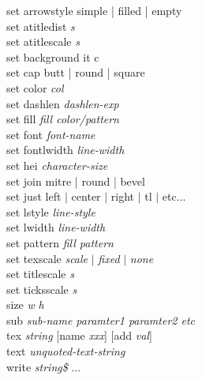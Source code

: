 {\sf set arrowstyle {\sf simple | filled | empty}} \\
{\sf set atitledist {\it s}}  \\
{\sf set atitlescale {\it s}}  \\
{\sf set background {it c}} \\
{\sf set cap {\sf butt | round | square}}  \\
{\sf set color {\it col}}  \\
{\sf set dashlen {\it dashlen-exp}}  \\
{\sf set fill {\it fill color/pattern}}  \\
{\sf set font {\it font-name}}  \\
{\sf set fontlwidth {\it line-width}}  \\
{\sf set hei {\it character-size}}  \\
{\sf set join {\sf mitre | round | bevel }}  \\
{\sf set just left $|$ center $|$ right  $|$ tl $|$ etc...}  \\
{\sf set lstyle {\it line-style}}  \\
{\sf set lwidth {\it line-width}}  \\
{\sf set pattern {\it fill pattern}}  \\
{\sf set texscale {\it scale} $|$ {\it fixed} $|$ {\it none}} \\
{\sf set titlescale {\it s}}  \\
{\sf set ticksscale {\it s}}  \\
{\sf size {\it w} {\it h}}  \\
{\sf sub {\it sub-name paramter1 paramter2 etc}}  \\
{\sf tex {\it string} [name {\it xxx}] [add {\it val}]}  \\
{\sf text {\it unquoted-text-string}}  \\
{\sf write {\it string\$} $\ldots$}

